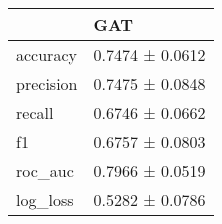 \begin{tabular}{ll}
\toprule
 & GAT \\
\midrule
accuracy & 0.7474 ± 0.0612 \\
precision & 0.7475 ± 0.0848 \\
recall & 0.6746 ± 0.0662 \\
f1 & 0.6757 ± 0.0803 \\
roc_auc & 0.7966 ± 0.0519 \\
log_loss & 0.5282 ± 0.0786 \\
\bottomrule
\end{tabular}
